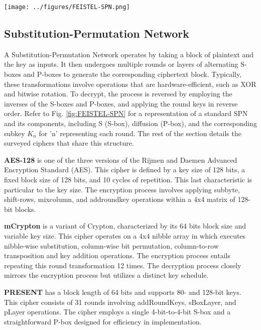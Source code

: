 \documentclass[conference,compsoc]{IEEEtran}
\begin{document}
\begin{figure*}
    \centering
    \texttt{[image: ../figures/FEISTEL-SPN.png]}
    \caption{Representation of a Feistel Network (left) and a Substitution-Permutation Network (right).}
    \label{fig:FEISTEL-SPN}
\end{figure*}

\subsection{Substitution-Permutation Network }

A Substitution-Permutation Network operates by taking a block of plaintext and the key as inputs. It then undergoes multiple rounds or layers of alternating S-boxes and P-boxes to generate the corresponding ciphertext block. Typically, these transformations involve operations that are hardware-efficient, such as XOR and bitwise rotation. To decrypt, the process is reversed by employing the inverses of the S-boxes and P-boxes, and applying the round keys in reverse order\cite{heys1996substitution}. Refer to Fig. \ref{fig:FEISTEL-SPN} for a representation of a standard SPN and its components, including S (S-box), diffusion (P-box), and the corresponding subkey $K_n$ for 'n' representing each round. The rest of the section details the surveyed ciphers that share this structure.

\textbf{AES-128} is one of the three versions of the Rijmen and Daemen Advanced Encryption Standard (AES). This cipher is defined by a key size of 128 bits, a fixed block size of 128 bits, and 10 cycles of repetition. This last characteristic is particular to the key size. The encryption process involves applying subbyte, shift-rows, mixcolumn, and addroundkey operations within a 4x4 matrix of 128-bit blocks.

\textbf{mCrypton} is a variant of Crypton, characterized by its 64 bits block size and variable key size. This cipher operates on a 4x4 nibble array in which executes nibble-wise substitution, column-wise bit permutation, column-to-row transposition and key addition operations. The encryption process entails repeating this round transformation 12 times. The decryption process closely mirrors the encryption process but utilizes a distinct key schedule.

\textbf{PRESENT} has a block length of 64 bits and supports 80- and 128-bit keys. This cipher consists of 31 rounds involving addRoundKeys, sBoxLayer, and pLayer operations. The cipher employs a single 4-bit-to-4-bit S-box and a straightforward P-box designed for efficiency in implementation.
\end{document}
